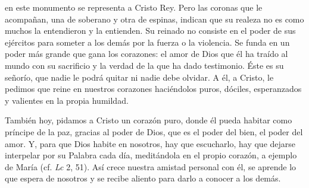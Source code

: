 \begin{body}
 en este monumento se representa a Cristo Rey. Pero las coronas que le acompañan, una de soberano y otra de espinas, indican que su realeza no es como muchos la entendieron y la entienden. Su reinado no consiste en el poder de sus ejércitos para someter a los demás por la fuerza o la violencia. Se funda en un poder más grande que gana los corazones: el amor de Dios que él ha traído al mundo con su sacrificio y la verdad de la que ha dado testimonio. Éste es su señorío, que nadie le podrá quitar ni nadie debe olvidar.  A él, a Cristo, le pedimos que reine en nuestros corazones haciéndolos puros, dóciles, esperanzados y valientes en la propia humildad.

También hoy,  pidamos a Cristo un corazón puro, donde él pueda habitar como príncipe de la paz, gracias al poder de Dios, que es el poder del bien, el poder del amor. Y, para que Dios habite en nosotros, hay que escucharlo, hay que dejarse interpelar por su Palabra cada día, meditándola en el propio corazón, a ejemplo de María (cf. \textit{Lc} 2, 51). Así crece nuestra amistad personal con él, se aprende lo que espera de nosotros y se recibe aliento para darlo a conocer a los demás.


\end{body}

